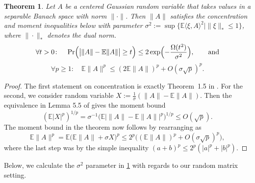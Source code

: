 \documentclass[aos]{imsart}
\newtheorem{theorem}{Theorem}[section]
\newtheorem{remark}[theorem]{Remark}
\theoremstyle{definition}
\numberwithin{equation}{section}
\DeclarePairedDelimiter{\abs}{\lvert}{\rvert}
\DeclarePairedDelimiter{\norm}{\lVert}{\rVert}
\newcommand{\E}{\mathbb{E}}
\newcommand{\MW}[1]{{\color{red}[MW: #1]}}
\newcommand{\MW}[1]{{}}
\begin{document}
\begin{appendix}
\begin{theorem}\label{thm:banach conc}
Let $A$ be a centered Gaussian random variable that takes values in a separable Banach space with norm $\|\cdot\|$.
Then $\|A\|$ satisfies the concentration and moment inequalities below with parameter $\sigma^2 := \sup \{ \E \langle \xi, A \rangle^{2} \mid \|\xi\|_{*} \leq 1 \}$, where $\|\cdot\|_{*}$ denotes the dual norm.
\[ \forall t > 0 \colon \quad \Pr\Bigl( \abs[\big]{\norm A - \E \norm A} \geq t\Bigr) \leq 2 \exp\Bigl( - \frac{\Omega(t^2)}{\sigma^{2}}\Bigr)  , \qquad \text{and}  \]
\begin{equation}\label{eq:conc via moments}
  \forall p \geq 1 \colon \quad \E \|A\|^{p} \leq (2 \E \|A\|)^{p}  + O ( \sigma \sqrt{p} )^{p}.
\end{equation}
\end{theorem}
\begin{proof}
The first statement on concentration is exactly Theorem~1.5 in \cite{P86}. For the second, we consider random variable $X := \frac{1}{\sigma} (\|A\| - \E \|A\| )$. Then the equivalence in Lemma 5.5 of \cite{vershynin2010introduction} gives the moment bound
\[ ( \E |X|^{p} )^{1/p} = \sigma^{-1} \Big( \E \Big| \|A\| - \E \|A\| \Big|^{p} \Big)^{1/p} \leq O(\sqrt{p}) .      \]
The moment bound in the theorem now follows by rearranging as
\[ \E \|A\|^{p} = \E \Big( \E \|A\| + \sigma X  \Big)^{p} \leq 2^{p} \Big( (\E \|A\|)^{p} + O( \sigma \sqrt{p} )^{p} \Big)  ,  \]
where the last step was by the simple inequality $(a+b)^{p} \leq 2^{p} (|a|^{p} + |b|^{p})$. 
\end{proof}


Below, we calculate the $\sigma^{2}$ parameter in \cref{thm:banach conc} with regards to our random matrix setting. 


\end{appendix}
\end{document}
